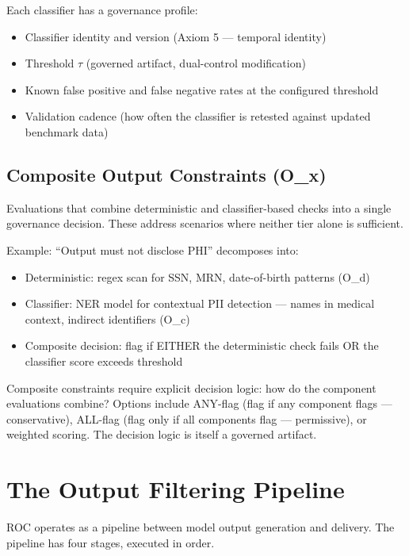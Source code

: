 Each classifier has a governance profile:

\begin{itemize}
  \item Classifier identity and version (Axiom 5 --- temporal identity)
  \item Threshold $\tau$ (governed artifact, dual-control modification)
  \item Known false positive and false negative rates at the configured threshold
  \item Validation cadence (how often the classifier is retested against updated benchmark data)
\end{itemize}


\subsection{Composite Output Constraints (O\_x)}


Evaluations that combine deterministic and classifier-based checks into a single governance decision. These address scenarios where neither tier alone is sufficient.

Example: ``Output must not disclose PHI'' decomposes into:

\begin{itemize}
  \item Deterministic: regex scan for SSN, MRN, date-of-birth patterns (O\_\allowbreak{}d)
  \item Classifier: NER model for contextual PII detection --- names in medical context, indirect identifiers (O\_\allowbreak{}c)
  \item Composite decision: flag if EITHER the deterministic check fails OR the classifier score exceeds threshold
\end{itemize}


Composite constraints require explicit decision logic: how do the component evaluations combine? Options include ANY-flag (flag if any component flags --- conservative), ALL-flag (flag only if all components flag --- permissive), or weighted scoring. The decision logic is itself a governed artifact.



\section{The Output Filtering Pipeline}
\label{sec:controls-5}


ROC operates as a pipeline between model output generation and delivery. The pipeline has four stages, executed in order.

